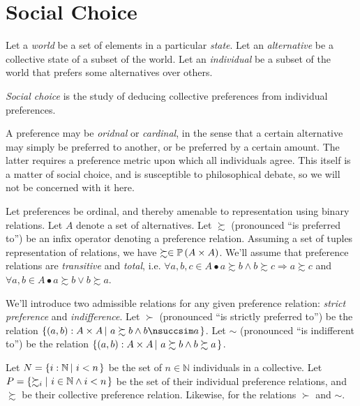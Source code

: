 

\section{Social Choice}

\def\pref{\succsim}
\def\npref{\nsuccsim}
\def\spref{\succ}
\def\nspref{\nsucc}
\def\indif{\sim}
\def\nindif{\nsim}

Let a \emph{world} be a set of elements in a particular \emph{state}. Let an
\emph{alternative} be a collective state of a subset of the world. Let an
\emph{individual} be a subset of the world that prefers some alternatives over
others.

\emph{Social choice} is the study of deducing collective preferences from
individual preferences.

A preference may be \emph{oridnal} or \emph{cardinal}, in the sense that a
certain alternative may simply be preferred to another, or be preferred by a
certain amount. The latter requires a preference metric upon which all
individuals agree. This itself is a matter of social choice, and is susceptible
to philosophical debate, so we will not be concerned with it here.

Let preferences be ordinal, and thereby amenable to representation using binary
relations. Let $A$ denote a set of alternatives. Let $\pref$ (pronounced ``is
preferred to'') be an infix operator denoting a preference relation. Assuming a
set of tuples representation of relations, we have $\pref \in
\mathbb{P}\p{A\times A}$.  We'll assume that preference relations are
\emph{transitive} and \emph{total}, i.e.  $\forall a,b,c\in A \bullet a\pref
b \wedge b \pref c \Rightarrow a \pref c$ and $\forall a,b\in A \bullet a \pref
b \vee b \pref a$.

We'll introduce two admissible relations for any given preference relation:
\emph{strict preference} and \emph{indifference}. Let $\spref$ (pronounced ``is
strictly preferred to'') be the relation $\set{\p{a,b} : A \times A \st{a \pref
b \wedge b \npref a}}$. Let $\indif$ (pronounced ``is indifferent to'') be the
relation $\set{\p{a,b} : A \times A \st{a \pref b \wedge b \pref a}}$.

Let $N=\left\{{i:\mathbb{N}\left|\ {i<n}\right.}\right\}$ be the set of $n\in\mathbb{N}$ individuals
in a collective.  Let $P=\set{\pref_i\st{i\in \mathbb{N} \wedge i < n}}$ be the
set of their individual preference relations, and $\pref$ be their collective
preference relation.  Likewise, for the relations $\spref$ and $\indif$.

